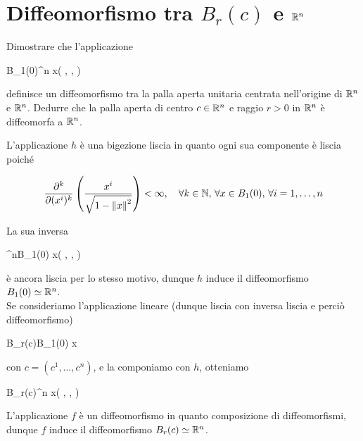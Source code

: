 %

\newpage

%

\section{Diffeomorfismo tra $ B_{r}(c) $ e $ \mathbb{R}^{n} $}\label{es1-4}

\begin{tcolorbox}
	Dimostrare che l'applicazione
	
		{B_{1}(0)}{\R^{n}}
		{x}{\left( , \cdots,  \right)}
	
	definisce un diffeomorfismo tra la palla aperta unitaria centrata nell'origine di $ \mathbb{R}^{n} $ e $ \mathbb{R}^{n} $. Dedurre che la palla aperta di centro $ c \in \mathbb{R}^{n} $ e raggio $ r > 0 $ in $ \mathbb{R}^{n} $ è diffeomorfa a $ \mathbb{R}^{n} $.
\end{tcolorbox}

L'applicazione $ h $ è una bigezione liscia in quanto ogni sua componente è liscia poiché

\begin{equation}
	\pdv[k]{(x^{i})} \left( \dfrac{x^{i}}{\sqrt{ 1-\norm{x}^{2} }} \right) < \infty \qcomma \forall k \in \N, \, \forall x \in B_{1}(0), \, \forall i=1,\dots,n
\end{equation}

La sua inversa

	{\R^{n}}{B_{1}(0)}
	{x}{\left( , \cdots,  \right)}

è ancora liscia per lo stesso motivo, dunque $ h $ induce il diffeomorfismo $ B_{1}(0) \simeq \mathbb{R}^{n} $.\\
Se consideriamo l'applicazione lineare (dunque liscia con inversa liscia e perciò diffeomorfismo)

	{B_{r}(c)}{B_{1}(0)}
	{x}{}

con $ c = (c^{1},\dots,c^{n}) $, e la componiamo con $ h $, otteniamo

	{B_{r}(c)}{\R^{n}}
	{x}{\left( , \cdots,  \right)}

L'applicazione $ f $ è un diffeomorfismo in quanto composizione di diffeomorfismi, dunque $ f $ induce il diffeomorfismo $ B_{r}(c) \simeq \mathbb{R}^{n} $.

